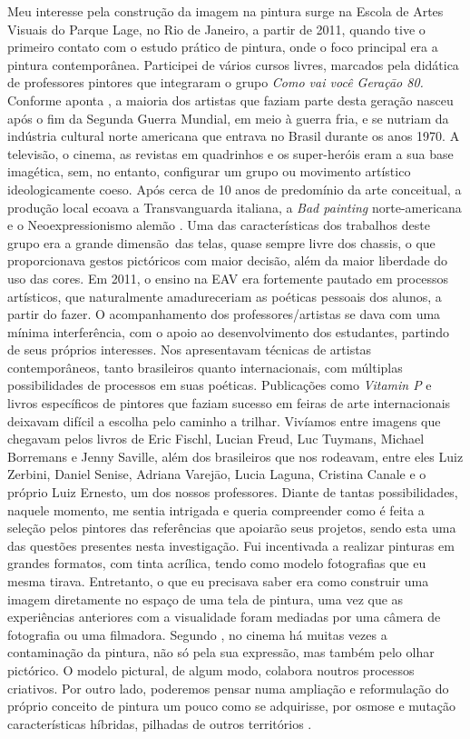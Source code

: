Meu interesse pela construção da imagem na pintura surge na Escola de
Artes Visuais do Parque Lage, no Rio de Janeiro, a partir de 2011,
quando tive o primeiro contato com o estudo prático de pintura, onde o
foco principal era a pintura contemporânea. Participei de vários cursos
livres, marcados pela didática de professores pintores que integraram o
grupo \emph{Como vai você Geraçāo 80.} Conforme aponta
\textcite{bulhoes2018geracao}, a maioria dos artistas que faziam parte
desta geração nasceu após o fim da Segunda Guerra Mundial, em meio à
guerra fria, e se nutriam da indústria cultural norte americana que
entrava no Brasil durante os anos 1970. A televisão, o cinema, as
revistas em quadrinhos e os super-heróis eram a sua base imagética,
sem, no entanto, configurar um grupo ou movimento artístico
ideologicamente coeso. Após cerca de 10 anos de predomínio da arte
conceitual, a produção local ecoava a Transvanguarda italiana, a
\emph{Bad painting} norte-americana e o Neoexpressionismo alemão \parencite[62]{bulhoes2018geracao}. Uma das características dos trabalhos
deste grupo era a grande dimensão~das telas, quase sempre livre dos
chassis, o que proporcionava gestos pictóricos com maior decisão, além
da maior liberdade do uso das cores. Em 2011, o ensino na EAV era
fortemente pautado em processos artísticos, que naturalmente
amadureceriam as poéticas pessoais dos alunos, a partir do fazer. O
acompanhamento dos professores/artistas se dava com uma mínima
interferência, com o apoio ao desenvolvimento dos estudantes, partindo
de seus próprios interesses. Nos apresentavam técnicas de artistas
contemporâneos, tanto brasileiros quanto internacionais, com múltiplas
possibilidades de processos em suas poéticas. Publicações como
\emph{Vitamin P} e livros específicos de pintores que faziam sucesso em
feiras de arte internacionais deixavam difícil a escolha pelo caminho a
trilhar. Vivíamos entre imagens que chegavam pelos livros de Eric
Fischl, Lucian Freud, Luc Tuymans, Michael Borremans e Jenny Saville,
além dos brasileiros que nos rodeavam, entre eles Luiz Zerbini, Daniel
Senise, Adriana Varejāo, Lucia Laguna, Cristina Canale e o próprio Luiz
Ernesto, um dos nossos professores. Diante de tantas possibilidades,
naquele momento, me sentia intrigada e queria compreender como é feita
a seleção pelos pintores das referências que apoiarão seus projetos,
sendo esta uma das questões presentes nesta investigação. Fui
incentivada a realizar pinturas em grandes formatos, com tinta
acrílica, tendo como modelo fotografias que eu mesma tirava.
Entretanto, o que eu precisava saber era como construir uma imagem
diretamente no espaço de uma tela de pintura, uma vez que as
experiências anteriores com a visualidade foram mediadas por uma câmera
de fotografia ou uma filmadora. Segundo \textcite{sabino2000pintura},
no cinema há muitas vezes a contaminação da
pintura, não só pela sua expressão, mas também pelo olhar pictórico. O
modelo pictural, de algum modo, colabora noutros processos criativos.
Por outro lado, poderemos pensar numa ampliação e reformulação do
próprio conceito de pintura um pouco como se adquirisse, por osmose e
mutação características híbridas, pilhadas de outros territórios 
\parencite[132-133]{sabino2000pintura}.

